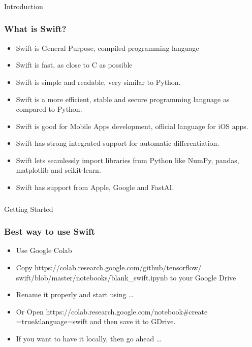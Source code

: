 \begin{frame}[fragile]\frametitle{}
\begin{center}
{\Large Introduction}
\end{center}
\end{frame}



\begin{frame} \frametitle{What is Swift?}
\begin{itemize}
\item Swift is General Purpose, compiled programming language
\item Swift is fast, as close to C as possible
\item Swift is simple and readable, very similar to Python. 
\item Swift is a more efficient, stable and secure programming language as compared to Python.
\item Swift is good for Mobile Apps development, official language for iOS apps.
\item Swift has strong integrated support for automatic differentiation.
\item Swift lets seamlessly import libraries from Python like NumPy, pandas, matplotlib and scikit-learn. 
\item Swift has support from Apple, Google and FastAI.
\end{itemize}
\end{frame}


\begin{frame}[fragile]\frametitle{}
\begin{center}
{\Large Getting Started}
\end{center}
\end{frame}

\begin{frame} \frametitle{Best way to use Swift}

\begin{itemize}
\item Use Google Colab
\item Copy https://colab.research.google.com/github/tensorflow/ swift/blob/master/notebooks/blank\_swift.ipynb to your Google Drive
\item Rename it properly and start using \ldots
\item Or Open https://colab.research.google.com/notebook\#create =true\&language=swift and then save it to GDrive.
\item If you want to have it locally, then go ahead \ldots
\end{itemize}

\end{frame}



